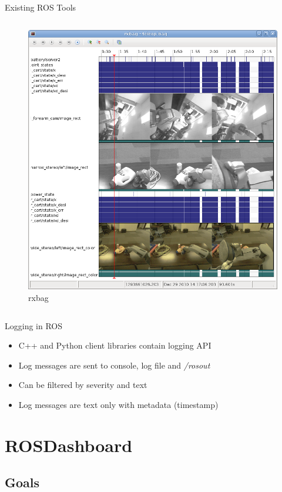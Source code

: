 \documentclass[compress]{beamer}
\begin{document}
\begin{frame}{Existing ROS Tools}
\begin{columns}
\begin{column}{.4\textwidth}
\begin{figure}[t]
    \centering
    \includegraphics[width=.85\textwidth]{images/rxbag_screenshot.png}
    \caption{rxbag}
\end{figure}
\end{column}
\end{columns}
\end{frame}

\begin{frame}{Logging in ROS}
\begin{itemize}
\item C++ and Python client libraries contain logging API
\item Log messages are sent to console, log file and \emph{/rosout}
\item Can be filtered by severity and text
\item Log messages are text only with metadata (timestamp)
\end{itemize}
\end{frame}

\section{ROSDashboard}
\subsection{Goals}
\end{document}

